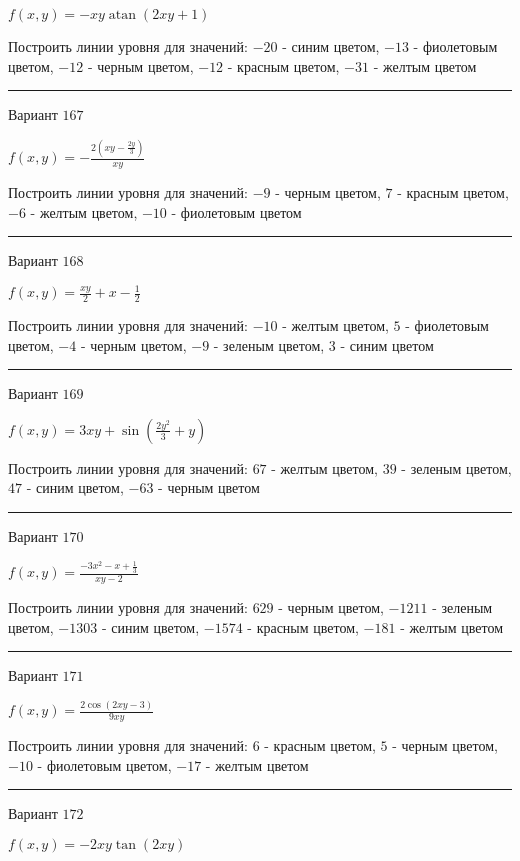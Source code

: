 \documentclass[11pt]{report}
\begin{document}
$f(x, y) = - x y \operatorname{atan}{\left(2 x y + 1 \right)}$

Построить линии уровня для значений: $-20$ - синим цветом, $-13$ - фиолетовым цветом, $-12$ - черным цветом, $-12$ - красным цветом, $-31$ - желтым цветом
\begin{center}
\noindent\rule{8cm}{0.4pt}
\end{center}
Вариант $167$


$f(x, y) = - \frac{2 \left(x y - \frac{2 y}{3}\right)}{x y}$

Построить линии уровня для значений: $-9$ - черным цветом, $7$ - красным цветом, $-6$ - желтым цветом, $-10$ - фиолетовым цветом
\begin{center}
\noindent\rule{8cm}{0.4pt}
\end{center}
Вариант $168$


$f(x, y) = \frac{x y}{2} + x - \frac{1}{2}$

Построить линии уровня для значений: $-10$ - желтым цветом, $5$ - фиолетовым цветом, $-4$ - черным цветом, $-9$ - зеленым цветом, $3$ - синим цветом
\begin{center}
\noindent\rule{8cm}{0.4pt}
\end{center}
Вариант $169$


$f(x, y) = 3 x y + \sin{\left(\frac{2 y^{2}}{3} + y \right)}$

Построить линии уровня для значений: $67$ - желтым цветом, $39$ - зеленым цветом, $47$ - синим цветом, $-63$ - черным цветом
\begin{center}
\noindent\rule{8cm}{0.4pt}
\end{center}
Вариант $170$


$f(x, y) = \frac{- 3 x^{2} - x + \frac{1}{3}}{x y - 2}$

Построить линии уровня для значений: $629$ - черным цветом, $-1211$ - зеленым цветом, $-1303$ - синим цветом, $-1574$ - красным цветом, $-181$ - желтым цветом
\begin{center}
\noindent\rule{8cm}{0.4pt}
\end{center}
Вариант $171$


$f(x, y) = \frac{2 \cos{\left(2 x y - 3 \right)}}{9 x y}$

Построить линии уровня для значений: $6$ - красным цветом, $5$ - черным цветом, $-10$ - фиолетовым цветом, $-17$ - желтым цветом
\begin{center}
\noindent\rule{8cm}{0.4pt}
\end{center}
Вариант $172$


$f(x, y) = - 2 x y \tan{\left(2 x y \right)}$
\end{document}

